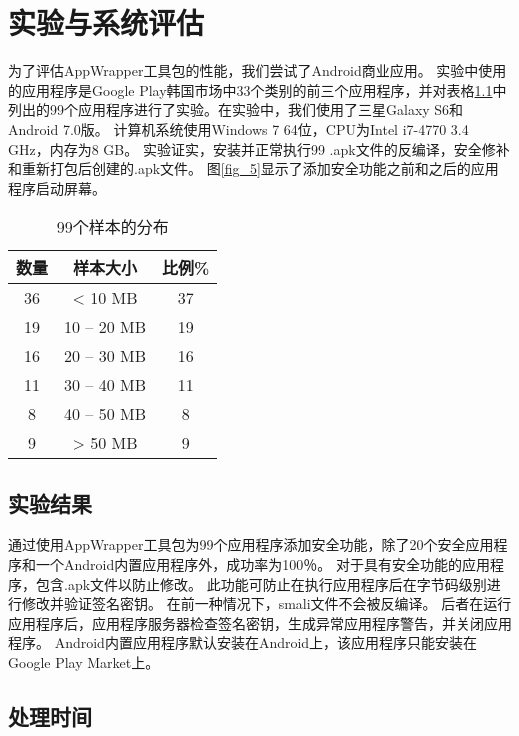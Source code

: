 \chapter{实验与系统评估}
	
	为了评估AppWrapper工具包的性能，我们尝试了Android商业应用。 实验中使用的应用程序是Google Play韩国市场中33个类别的前三个应用程序，并对表格\ref{tab2}中列出的99个应用程序进行了实验。在实验中，我们使用了三星Galaxy S6和Android 7.0版。 计算机系统使用Windows 7 64位，CPU为Intel i7-4770 3.4 GHz，内存为8 GB。 实验证实，安装并正常执行99 .apk文件的反编译，安全修补和重新打包后创建的.apk文件。 图\ref{fig_5}显示了添加安全功能之前和之后的应用程序启动屏幕。
	
	\begin{table}
		\centering
		\caption{99个样本的分布}
		\label{tab2}
		\begin{tabular}{|c|c|c|}
			\hline
			数量 & 样本大小 & 比例\% \\
			\hline
			36 & < 10 MB & 37\\
			\hline
			19 & 10 – 20 MB & 19\\
			\hline
			16 & 20 – 30 MB & 16\\
			\hline
			11 & 30 – 40 MB & 11\\
			\hline
			8 & 40 – 50 MB & 8\\
			\hline
			9 & > 50 MB & 9\\
			\hline
		\end{tabular}
	\end{table}

	\section{实验结果}
		通过使用AppWrapper工具包为99个应用程序添加安全功能，除了20个安全应用程序和一个Android内置应用程序外，成功率为100％。 对于具有安全功能的应用程序，包含.apk文件以防止修改。 此功能可防止在执行应用程序后在字节码级别进行修改并验证签名密钥。 在前一种情况下，smali文件不会被反编译。 后者在运行应用程序后，应用程序服务器检查签名密钥，生成异常应用程序警告，并关闭应用程序。 Android内置应用程序默认安装在Android上，该应用程序只能安装在Google Play Market上。
		
	\section{处理时间}
	
